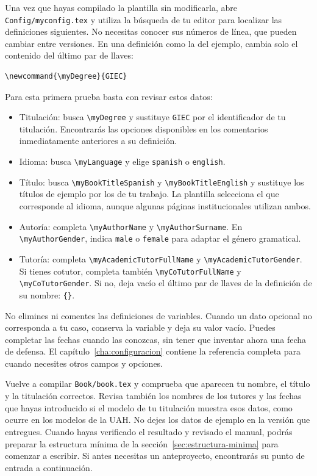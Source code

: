 Una vez que hayas compilado la plantilla sin modificarla, abre \texttt{Config/myconfig.tex} y utiliza la búsqueda de tu editor para localizar las definiciones siguientes. No necesitas conocer sus números de línea, que pueden cambiar entre versiones. En una definición como la del ejemplo, cambia solo el contenido del último par de llaves:

\begin{verbatim}
\newcommand{\myDegree}{GIEC}
\end{verbatim}

Para esta primera prueba basta con revisar estos datos:

\begin{itemize}
  \item Titulación: busca \texttt{\textbackslash{}myDegree} y sustituye \texttt{GIEC} por el identificador de tu titulación. Encontrarás las opciones disponibles en los comentarios inmediatamente anteriores a su definición.
  \item Idioma: busca \texttt{\textbackslash{}myLanguage} y elige \texttt{spanish} o \texttt{english}.
  \item Título: busca \texttt{\textbackslash{}myBookTitleSpanish} y \texttt{\textbackslash{}myBookTitleEnglish} y sustituye los títulos de ejemplo por los de tu trabajo. La plantilla selecciona el que corresponde al idioma, aunque algunas páginas institucionales utilizan ambos.
  \item Autoría: completa \texttt{\textbackslash{}myAuthorName} y \texttt{\textbackslash{}myAuthorSurname}. En \texttt{\textbackslash{}myAuthorGender}, indica \texttt{male} o \texttt{female} para adaptar el género gramatical.
  \item Tutoría: completa \texttt{\textbackslash{}myAcademicTutorFullName} y \texttt{\textbackslash{}myAcademicTutorGender}. Si tienes cotutor, completa también \texttt{\textbackslash{}myCoTutorFullName} y \texttt{\textbackslash{}myCoTutorGender}. Si no, deja vacío el último par de llaves de la definición de su nombre: \texttt{\{\}}.
\end{itemize}

No elimines ni comentes las definiciones de variables. Cuando un dato opcional no corresponda a tu caso, conserva la variable y deja su valor vacío. Puedes completar las fechas cuando las conozcas, sin tener que inventar ahora una fecha de defensa. El capítulo~\ref{cha:configuracion} contiene la referencia completa para cuando necesites otros campos y opciones.

Vuelve a compilar \texttt{Book/book.tex} y comprueba que aparecen tu nombre, el título y la titulación correctos. Revisa también los nombres de los tutores y las fechas que hayas introducido si el modelo de tu titulación muestra esos datos, como ocurre en los modelos de la UAH. No dejes los datos de ejemplo en la versión que entregues. Cuando hayas verificado el resultado y revisado el manual, podrás preparar la estructura mínima de la sección~\ref{sec:estructura-minima} para comenzar a escribir. Si antes necesitas un anteproyecto, encontrarás su punto de entrada a continuación.

